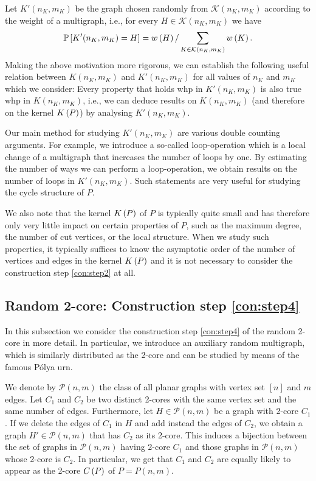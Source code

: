 Let $K'(n_K,m_K)$ be the graph chosen randomly from $\mathcal{K}(n_K,m_K)$ according to the weight of a multigraph, i.e., for every $H\in\mathcal{K}(n_K,m_K)$ we have
\begin{align*}
    \mathbb{P}\left[K'(n_K,m_K)=H\right]=w\left(H\right)/\sum_{K\in\mathcal{K}(n_K,m_K)}w\left(K\right).
\end{align*}
Making the above motivation more rigorous, we can establish the following useful relation between $K(n_K,m_K)$ and $K'(n_K,m_K)$ for all values of $n_K$ and $m_K$ which we consider: Every property that holds whp in $K'(n_K,m_K)$ is also true whp in $K(n_K,m_K)$, i.e., we can deduce results on $K(n_K,m_K)$ (and therefore on the kernel $K\left(P\right)$) by analysing $K'(n_K,m_K)$.

Our main method for studying $K'(n_K, m_K)$ are various double counting arguments. For example, we introduce a so-called loop-operation which is a local change of a multigraph that increases the number of loops by one. By estimating the number of ways we can perform a loop-operation, we obtain results on the number of loops in $K'(n_K, m_K)$. Such statements are very useful for studying the cycle structure of $P$.

We also note that the kernel $K\left(P\right)$ of $P$ is typically quite small and has therefore only very little impact on certain properties of $P$, such as the maximum degree, the number of cut vertices, or the local structure. When we study such properties, it typically suffices to know the asymptotic order of the number of vertices and edges in the kernel $K\left(P\right)$ and it is not necessary to consider the construction step \ref{con:step2} at all.


\subsection[Random 2-core]{Random 2-core: Construction step \ref{con:step4}}\label{sub:random_core}
In this subsection we consider the construction step \ref{con:step4} of the random 2-core in more detail. In particular, we introduce an auxiliary random multigraph, which is similarly distributed as the 2-core and can be studied by means of the famous P\'olya urn.

We denote by $\mathcal{P}(n,m)$ the class of all planar graphs with vertex set $[n]$ and $m$ edges. Let $C_1$ and $C_2$ be two distinct 2-cores with the same vertex set and the same number of edges. Furthermore, let $H\in \mathcal{P}(n,m)$ be a graph with 2-core $C_1$. If we delete the edges of $C_1$ in $H$ and add instead the edges of $C_2$, we obtain a graph $H'\in\mathcal{P}(n,m)$ that has $C_2$ as its 2-core. This induces a bijection between the set of graphs in $\mathcal{P}(n,m)$ having 2-core $C_1$ and those graphs in $\mathcal{P}(n,m)$ whose 2-core is $C_2$. In particular, we get that $C_1$ and $C_2$ are equally likely to appear as the 2-core $C\left(P\right)$ of $P=P(n,m)$. 


